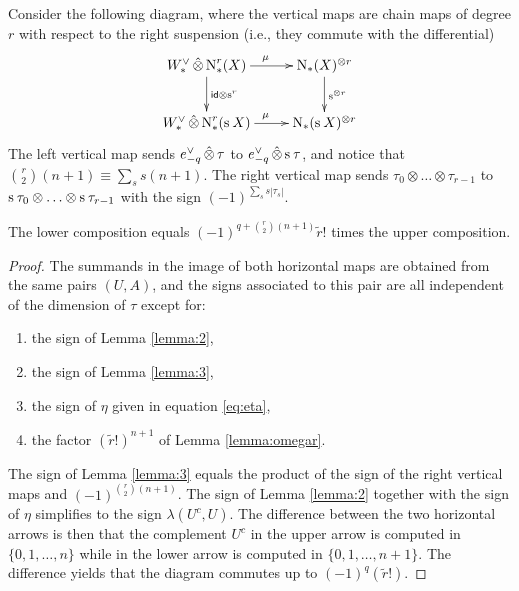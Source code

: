 Consider the following diagram, where the vertical maps are chain maps of degree $r$ with respect to the right suspension (i.e., they commute with the differential)
\[
\xymatrix{
	\Wd\hotimes \rchains(X)\ar[r]^{\mu}\ar[d]^{\id\otimes \sus{r}} & \chains(X)^{\otimes r} \ar[d]^{\sus{\otimes r}}
	\\
	\Wd\hotimes \rchains(\sus{} X)\ar[r]^{\mu} & \chains(\sus{}X)^{\otimes r}	
}
\]
The left vertical map sends $e_{-q}^\vee\operatorname{\hat{\otimes}} \tau$ to $e_{-q}^\vee\operatorname{\hat{\otimes}} \operatorname{s}^{}\tau$, and notice that $\binom{r}{2}(n+1) \equiv \sum_s s(n+1)$. The right vertical map sends $\tau_0\otimes \ldots\otimes \tau_{r-1}$ to $\operatorname{s}^{}\tau_0\otimes \ldots\otimes \operatorname{s}^{}\tau_{r-1}$ with the sign $(-1)^{\sum_s s|\tau_{s}|}$. 
\begin{lemma} The lower composition equals $(-1)^{q+\binom{r}{2}(n+1)}\tilde{r}!$ times the upper composition.
\end{lemma}
\begin{proof}
The summands in the image of both horizontal maps are obtained from the same pairs $(U,A)$, and the signs associated to this pair are all independent of the dimension of $\tau$ except for:
\begin{enumerate}
	\item the sign of Lemma \ref{lemma:2},
	\item the sign of Lemma \ref{lemma:3},
	\item the sign of $\eta$ given in equation \ref{eq:eta},
	\item the factor $(\tilde{r}!)^{n+1}$ of Lemma \ref{lemma:omegar}.
\end{enumerate}
The sign of Lemma \ref{lemma:3} equals the product of the sign of the right vertical maps and $(-1)^{\binom{r}{2}(n+1)}$. The sign of Lemma \ref{lemma:2} together with the sign of $\eta$ simplifies to the sign $\lambda(U^c,U)$. The difference between the two horizontal arrows is then that the complement $U^c$ in the upper arrow is computed in $\{0,1,\ldots,n\}$ while in the lower arrow is computed in $\{0,1,\ldots,n+1\}$. The difference yields that the diagram commutes up to $(-1)^q(\tilde{r}!)$. 
\end{proof}


